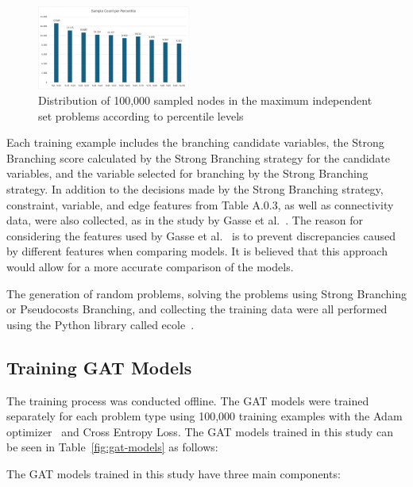 \begin{figure}[htb!]
    \centering
    \includegraphics[width=0.45\textwidth]{figures/Sample Distribution}
    \caption{Distribution of 100,000 sampled nodes in the maximum independent set problems according to percentile levels}
    \label{fig:sample-distribution}
\end{figure}


Each training example includes the branching candidate variables, the Strong Branching score calculated by the Strong Branching strategy for the candidate variables, and the variable selected for branching by the Strong Branching strategy.
In addition to the decisions made by the Strong Branching strategy, constraint, variable, and edge features from Table A.0.3, %
as well as connectivity data, were also collected, as in the study by Gasse et al.~\cite{gasseExactCombinatorialOptimization2019}.
The reason for considering the features used by Gasse et al.~\cite{gasseExactCombinatorialOptimization2019} is to prevent discrepancies caused by different features when comparing models.
It is believed that this approach would allow for a more accurate comparison of the models.

The generation of random problems, solving the problems using Strong Branching or Pseudocosts Branching, and collecting the training data were all performed using the Python library called ecole~\cite{prouvostEcoleGymlikeLibrary2020a}.


\subsection{Training GAT Models}
The training process was conducted offline.
The GAT models were trained separately for each problem type using 100,000 training examples with the Adam optimizer~\cite{kingmaAdamMethodStochastic2017} and Cross Entropy Loss.
The GAT models trained in this study can be seen in Table~\ref{fig:gat-models} as follows:




The GAT models trained in this study have three main components:

